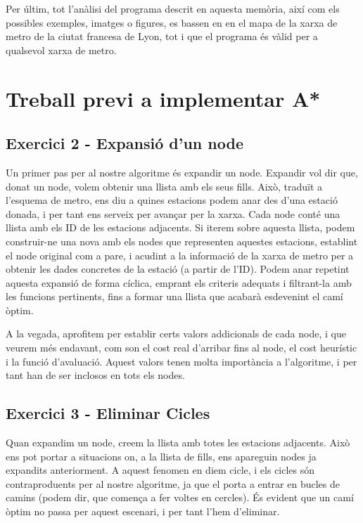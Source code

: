 \documentclass[a4paper,12pt]{article}
\begin{document}
    Per últim, tot l’anàlisi del programa descrit en aquesta memòria, així com els possibles exemples, imatges o figures, es bassen en en el mapa de la xarxa de metro de la ciutat francesa de Lyon, tot i que el programa és vàlid per a qualsevol xarxa de metro.


    \pagebreak

    \section*{Treball previ a implementar A*}

    \subsection*{Exercici 2 - Expansió d’un node}

    Un primer pas per al nostre algoritme és expandir un node. Expandir vol dir que, donat un node, volem obtenir una llista amb els seus fills. Això, traduït a l’esquema de metro, ens diu a quines estacions podem anar des d’una estació donada, i per tant ens serveix per avançar per la xarxa.
    Cada node conté una llista amb els ID de les estacions adjacents. Si iterem sobre aquesta llista, podem construir-ne una nova amb els nodes que representen aquestes estacions, establint el node original com a pare, i acudint a la informació de la xarxa de metro per a obtenir les dades concretes de la estació (a partir de l’ID).
    Podem anar repetint aquesta expansió de forma cíclica, emprant els criteris adequats i filtrant-la amb les funcions pertinents, fins a formar una llista que acabarà esdevenint el camí òptim.

    A la vegada, aprofitem per establir certs valors addicionals de cada node, i que veurem més endavant, com son el cost real d’arribar fins al node, el cost heurístic i la funció d'avaluació. Aquest valors tenen molta importància a l’algoritme, i per tant han de ser inclosos en tots els nodes.


    \subsection*{Exercici 3 - Eliminar Cicles}

    Quan expandim un node, creem la llista amb totes les estacions adjacents. Això ens pot portar a situacions on, a la llista de fills, ens apareguin nodes ja expandits anteriorment. A aquest fenomen en diem cicle, i els cicles són contraproduents per al nostre algoritme, ja que el porta a entrar en bucles de camins (podem dir, que comença a fer voltes en cercles). És evident que un camí òptim no passa per aquest escenari, i per tant l’hem d’eliminar.
\end{document}
